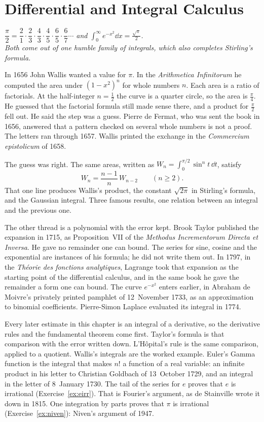 \chapter{Differential and Integral Calculus}\label{ch:calculus}

\begin{center}\itshape
$\dfrac\pi2=\dfrac21\cdot\dfrac23\cdot\dfrac43\cdot\dfrac45\cdot\dfrac65\cdot\dfrac67\cdots$ \quad and \quad $\displaystyle\int_0^\infty e^{-x^2}\dd x=\frac{\sqrt\pi}2$.\\
Both come out of one humble family of integrals, which also completes Stirling's formula.
\end{center}

In 1656 John Wallis wanted a value for $\pi$. In the \emph{Arithmetica Infinitorum} he computed the area under $(1-x^2)^n$ for whole numbers $n$. Each area is a ratio of factorials. At the half-integer $n=\frac12$ the curve is a quarter circle, so the area is $\frac\pi4$. He guessed that the factorial formula still made sense there, and a product for $\frac\pi2$ fell out. He said the step was a guess. Pierre de Fermat, who was sent the book in 1656, answered that a pattern checked on several whole numbers is not a proof. The letters ran through 1657. Wallis printed the exchange in the \emph{Commercium epistolicum} of 1658.

The guess was right. The same areas, written as $W_n=\int_0^{\pi/2}\sin^nt\,\dd t$, satisfy
\[
W_n=\frac{n-1}n\,W_{n-2}\qquad(n\ge2).
\]
That one line produces Wallis's product, the constant $\sqrt{2\pi}$ in Stirling's formula, and the Gaussian integral. Three famous results, one relation between an integral and the previous one.

The other thread is a polynomial with the error kept. Brook Taylor published the expansion in 1715, as Proposition~VII of the \emph{Methodus Incrementorum Directa et Inversa}. He gave no remainder one can bound. The series for sine, cosine and the exponential are instances of his formula; he did not write them out. In 1797, in the \emph{Th\'eorie des fonctions analytiques}, Lagrange took that expansion as the starting point of the differential calculus, and in the same book he gave the remainder a form one can bound. The curve $e^{-x^2}$ enters earlier, in Abraham de Moivre's privately printed pamphlet of 12~November 1733, as an approximation to binomial coefficients. Pierre-Simon Laplace evaluated its integral in 1774.

Every later estimate in this chapter is an integral of a derivative, so the derivative rules and the fundamental theorem come first. Taylor's formula is that comparison with the error written down. L'H\^opital's rule is the same comparison, applied to a quotient. Wallis's integrals are the worked example. Euler's Gamma function is the integral that makes $n!$ a function of a real variable: an infinite product in his letter to Christian Goldbach of 13~October 1729, and an integral in the letter of 8~January 1730. The tail of the series for $e$ proves that $e$ is irrational (Exercise~\ref{ex:eirr}). That is Fourier's argument, as de Stainville wrote it down in 1815. One integration by parts proves that $\pi$ is irrational (Exercise~\ref{ex:niven}): Niven's argument of 1947.

